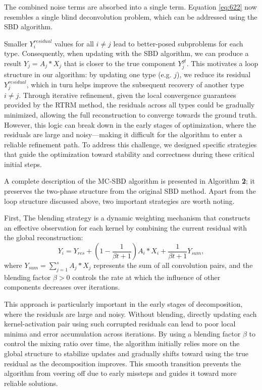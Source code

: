\noindent The combined noise terms are absorbed into a single term. Equation \ref{eq:622} now resembles a single blind deconvolution problem, which can be addressed using the \ac{SBD} algorithm.

Smaller $Y_i^{residual}$ values for all $i \neq j$ lead to better-posed subproblems for each type. Consequently, when updating with the \ac{SBD} algorithm, we can produce a result $Y_j = A_j* X_j$ that is closer to the true component $Y_j^{gt}$. This motivates a loop structure in our algorithm: by updating one type (e.g. $j$), we reduce its residual $Y_j^{residual}$, which in turn helps improve the subsequent recovery of another type $i \neq j$. Through iterative refinement, given the local convergence guarantees provided by the \ac{RTRM} method, the residuals across all types could be gradually minimized, allowing the full reconstruction to converge towards the ground truth. However, this logic can break down in the early stages of optimization, where the residuals are large and noisy—making it difficult for the algorithm to enter a reliable refinement path. To address this challenge, we designed specific strategies that guide the optimization toward stability and correctness during these critical initial steps.

A complete description of the \ac{MC-SBD} algorithm is presented in Algorithm \textbf{2}; it preserves the two-phase structure from the original \ac{SBD} method. Apart from the loop structure discussed above, two important strategies are worth noting. 

First, The blending strategy is a dynamic weighting mechanism that constructs an effective observation for each kernel by combining the current residual with the global reconstruction: 
\begin{equation}
	Y_i = Y_{res} + \left(1-\frac{1}{\beta t+1}\right)A_i * X_i + \frac{1}{\beta t+1}Y_{sum},
\end{equation}
\noindent where $Y_{sum} = \sum_{j=1}^s A_j * X_j$ represents the sum of all convolution pairs, and the blending factor $\beta > 0$ controls the rate at which the influence of other components decreases over iterations.

This approach is particularly important in the early stages of decomposition, where the residuals are large and noisy. Without blending, directly updating each kernel-activation pair using such corrupted residuals can lead to poor local minima and error accumulation across iterations. By using a blending factor $\beta$ to control the mixing ratio over time, the algorithm initially relies more on the global structure to stabilize updates and gradually shifts toward using the true residual as the decomposition improves. This smooth transition prevents the algorithm from veering off due to early missteps and guides it toward more reliable solutions.

